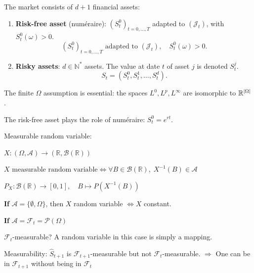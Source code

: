 \begin{definition}
The market consists of $d+1$ financial assets:
\begin{enumerate}
    \item \textbf{Risk-free asset} (numéraire): $(S_t^0)_{t=0,\ldots,T}$ adapted to $(\mathcal{J}_t)$, with $S_t^0(\omega)>0$.
    \begin{equation}
    (S_t^0)_{t=0,\ldots,T} \text{ adapted to } (\mathcal{J}_t), \quad S_t^0(\omega)>0.
    \end{equation}
    
    \item \textbf{Risky assets}: $d \in \mathbb{N}^*$ assets. The value at date $t$ of asset $j$ is denoted $S_t^j$.
    \begin{equation}
    S_t = (S_t^0, S_t^1, \ldots, S_t^d).
    \end{equation}
\end{enumerate}
\end{definition}

\begin{remarks}
\item The finite $\Omega$ assumption is essential: the spaces $L^0,L^p,L^\infty$ are isomorphic to $\mathbb{R}^{|\Omega|}$.
\item The risk-free asset plays the role of numéraire: $S_t^0 = e^{rt}$.
\item Measurable random variable:

$X : (\Omega, \mathcal{A}) \longrightarrow (\mathbb{R}, \mathcal{B}(\mathbb{R}))$

$X \text{ measurable random variable} \Longleftrightarrow \forall B \in \mathcal{B}(\mathbb{R}), \; X^{-1}(B) \in \mathcal{A}$

$P_X : \mathcal{B}(\mathbb{R}) \longrightarrow [0,1], \quad B \longmapsto P(X^{-1}(B))$

\vspace{1em}
\textbf{If } $\mathcal{A} = \{\emptyset, \Omega\}$, 
then $X$ random variable $\Longleftrightarrow X$ constant.

\vspace{1em}

\textbf{If } $\mathcal{A} = \mathcal{F}_t = \mathcal{P}(\Omega)$

 $\mathcal{F}_t$-measurable? A random variable in this case is simply a mapping.

\vspace{1em}
\item Measurability:
$\hat{S}_{t+1}$ is $\mathcal{F}_{t+1}$-measurable but not $\mathcal{F}_t$-measurable. $\Rightarrow$ One can be in $\mathcal{F}_{t+1}$ without being in $\mathcal{F}_t$

\end{remarks}

